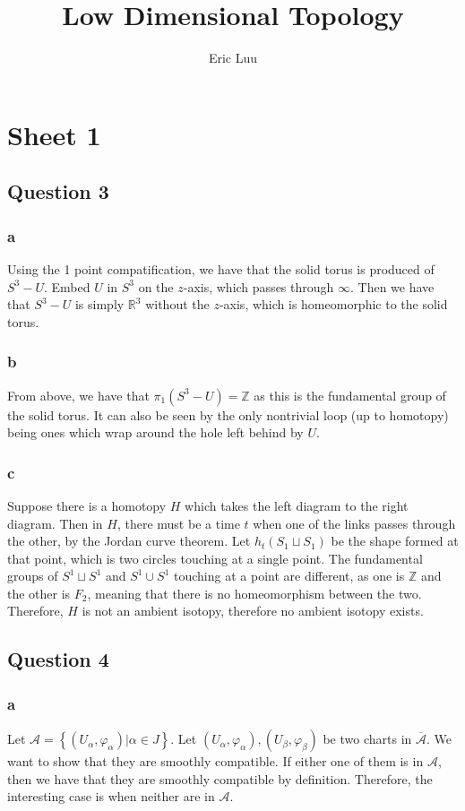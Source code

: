 \documentclass{article}
\title{Low Dimensional Topology}
\author{Eric Luu}
\theoremstyle{definition}
\numberwithin{theorem}{section}
\numberwithin{equation}{section}
\newcommand{\atlas}{\mathcal{A}}
\begin{document}
\section{Sheet 1}


\subsection{Question 3}

\subsubsection{a}
Using the 1 point compatification, we have that the solid torus is produced of $S^3 - U$. Embed $U$ in $S^3$ on the $z$-axis, which passes through $\infty$. Then we have that $S^3 - U$ is simply $\mathbb{R}^3$ without the $z$-axis, which is homeomorphic to the solid torus. 
\subsubsection{b}
From above, we have that $\pi_1(S^3 - U) = \mathbb{Z}$ as this is the fundamental group of the solid torus. It can also be seen by the only nontrivial loop (up to homotopy) being ones which wrap around the hole left behind by $U$. 
\subsubsection{c}
Suppose there is a homotopy $H$ which takes the left diagram to the right diagram. Then in $H$, there must be a time $t$ when one of the links passes through the other, by the Jordan curve theorem. Let $h_t(S_1 \sqcup S_1)$ be the shape formed at that point, which is two circles touching at a single point. The fundamental groups of $S^1 \sqcup S^1$ and $S^1 \cup S^1$ touching at a point are different, as one is $\mathbb{Z}$ and the other is $F_2$, meaning that there is no homeomorphism between the two. Therefore, $H$ is not an ambient isotopy, therefore no ambient isotopy exists. 

\subsection{Question 4}
\subsubsection{a}
Let $\atlas = \left\{(U_\alpha, \varphi_\alpha) | \alpha \in J\right\}$. Let $(U_\alpha, \varphi_\alpha), (U_\beta, \varphi_\beta)$ be two charts in $\overline{\atlas}$. We want to show that they are smoothly compatible. If either one of them is in $\atlas$, then we have that they are smoothly compatible by definition. Therefore, the interesting case is when neither are in $\atlas$. 
\end{document}
